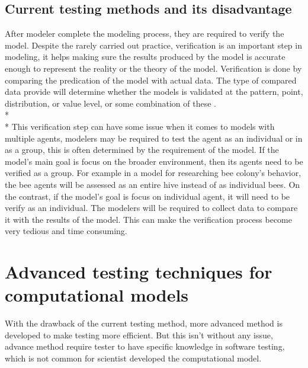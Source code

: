 \subsection{Current testing methods and its disadvantage}
After modeler complete the modeling process, they are required to verify the model. 
Despite the rarely carried out practice, verification is an important step in modeling, it helps making sure the results produced by the model is accurate enough to represent the reality or the theory of the model. Verification is done by comparing the predication of the model with actual data. The type of compared data provide will determine whether the models is validated at the pattern, point, distribution, or value level, or some combination of these \cite{Reference12}. \\*\\*
This verification step can have some issue when it comes to models with multiple agents, modelers may be required to test the agent as an individual or in as a group, this is often determined by the requirement of the model. If the model’s main goal is focus on the broader environment, then its agents need to be verified as a group\cite{Reference12}. For example in a model for researching bee colony’s behavior, the bee agents will be assessed as an entire hive instead of as individual bees. On the contrast, if the model’s goal is focus on individual agent, it will need to be verify as an individual.
The modelers will be required to collect data to compare it with the results of the model. This can make the verification process become very tedious and time consuming. 

\section{Advanced testing techniques for computational models}
With the drawback of the current testing method, more advanced method is developed to make testing more efficient. But this isn’t without any issue, advance method require tester to have specific knowledge in software testing, which is not common for scientist developed the computational model.

